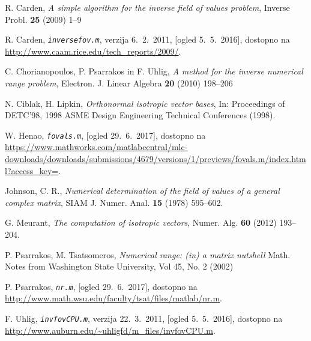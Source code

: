 \documentclass[12pt,a4paper]{amsart}
\theoremstyle{definition}
\theoremstyle{plain}
\begin{document}
\begin{thebibliography}{99}



R. Carden, \emph{A simple algorithm for the inverse field of values problem}, Inverse Probl. {\bf 25} (2009) 1--9

R. Carden, \emph{\texttt{inversefov.m}}, verzija 6.~2.~2011, [ogled 5.~5.~2016], dostopno na \url{http://www.caam.rice.edu/tech_reports/2009/}.

C. Chorianopoulos, P. Psarrakos in F. Uhlig, \emph{A method for the inverse numerical range problem}, Electron. J. Linear Algebra {\bf 20} (2010) 198--206

N. Ciblak, H. Lipkin, \emph{Orthonormal isotropic vector bases}, In: Proceedings of DETC'98, 1998 ASME Design Engineering Technical Conferences (1998).

W. Henao, \emph{\texttt{fovals.m}}, [ogled 29.~6.~2017], dostopno na \url{https://www.mathworks.com/matlabcentral/mlc-downloads/downloads/submissions/4679/versions/1/previews/fovals.m/index.html?access_key=}.

Johnson, C. R., \emph{Numerical determination of the field of values of a general complex matrix}, SIAM J. Numer. Anal. {\bf 15} (1978) 595--602.

G. Meurant, \emph{The computation of isotropic vectors}, Numer. Alg. {\bf 60} (2012) 193--204.

P. Psarrakos, M. Tsatsomeros, \emph{Numerical range: (in) a matrix nutshell} Math. Notes from Washington State University,  Vol 45, No. 2 (2002)

P. Psarrakos, \emph{\texttt{nr.m}}, [ogled 29.~6.~2017], dostopno na \url{http://www.math.wsu.edu/faculty/tsat/files/matlab/nr.m}.

F. Uhlig, \emph{\texttt{invfovCPU.m}}, verzija 22.~3.~2011, [ogled 5.~5.~2016], dostopno na \url{http://www.auburn.edu/~uhligfd/m_files/invfovCPU.m}.

\end{thebibliography}
\end{document}
